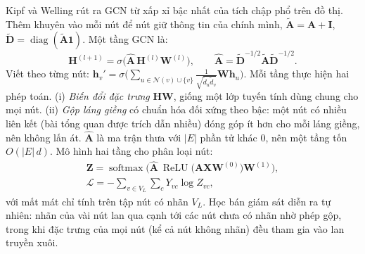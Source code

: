 Kipf và Welling \cite{kipf2017} rút ra GCN từ xấp xỉ bậc nhất của tích chập phổ trên đồ thị. Thêm khuyên vào mỗi nút để nút giữ thông tin của chính mình, $\tilde{\mathbf A}=\mathbf A+\mathbf I$, $\tilde{\mathbf D}=\operatorname{diag}(\tilde{\mathbf A}\mathbf 1)$. Một tầng GCN là:
\begin{equation}
\mathbf H^{(l+1)} = \sigma\!\Big(\hat{\mathbf A}\,\mathbf H^{(l)}\mathbf W^{(l)}\Big),\qquad \hat{\mathbf A} = \tilde{\mathbf D}^{-1/2}\tilde{\mathbf A}\tilde{\mathbf D}^{-1/2}.
\label{eq:gcn}
\end{equation}
Viết theo từng nút: $\mathbf h_v' = \sigma\big(\sum_{u\in\mathcal N(v)\cup\{v\}}\frac{1}{\sqrt{\tilde d_u\tilde d_v}}\mathbf W\mathbf h_u\big)$. Mỗi tầng thực hiện hai phép toán. (i) \emph{Biến đổi đặc trưng} $\mathbf H\mathbf W$, giống một lớp tuyến tính dùng chung cho mọi nút. (ii) \emph{Gộp láng giềng} có chuẩn hóa đối xứng theo bậc: một nút có nhiều liên kết (bài tổng quan được trích dẫn nhiều) đóng góp ít hơn cho mỗi láng giềng, nên không lấn át. $\hat{\mathbf A}$ là ma trận thưa với $|E|$ phần tử khác 0, nên một tầng tốn $O(|E|\,d)$. Mô hình hai tầng cho phân loại nút:
\begin{equation}
\begin{gathered}
\mathbf Z = \operatorname{softmax}\!\Big(\hat{\mathbf A}\ \operatorname{ReLU}\big(\hat{\mathbf A}\mathbf X\mathbf W^{(0)}\big)\mathbf W^{(1)}\Big), \\
\mathcal L = -\sum_{v\in V_L}\sum_{c} Y_{vc}\log Z_{vc},
\end{gathered}
\label{eq:gcn2}
\end{equation}
với mất mát chỉ tính trên tập nút có nhãn $V_L$. Học bán giám sát diễn ra tự nhiên: nhãn của vài nút lan qua cạnh tới các nút chưa có nhãn nhờ phép gộp, trong khi đặc trưng của mọi nút (kể cả nút không nhãn) đều tham gia vào lan truyền xuôi.

